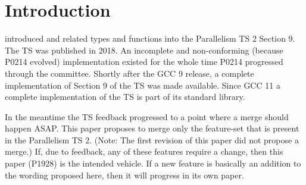 \pagestyle{scrheadings}




\section{Introduction}
\cite{P0214R9} introduced \stdx{} and related types and functions
into the Parallelism TS 2 Section 9.
The TS was published in 2018.
An incomplete and non-conforming (because P0214 evolved) implementation existed for the whole time P0214 progressed through the committee.
Shortly after the GCC 9 release, a complete implementation of Section 9 of the TS was made available.
Since GCC 11 a complete  implementation of the TS is part of its standard library.

In the meantime the TS feedback progressed to a point where a merge should happen ASAP.
This paper proposes to merge only the feature-set that is present in the Parallelism TS 2.
(Note: The first revision of this paper did not propose a merge.)
If, due to feedback, any of these features require a change, then this paper (P1928) is the intended vehicle.
If a new feature is basically an addition to the wording proposed here, then it will progress in its own paper.


